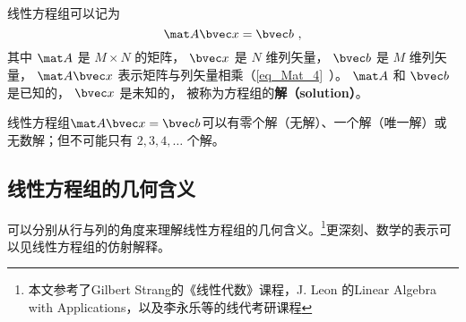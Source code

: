 
\begin{issues}
\issueDraft
\end{issues}


线性方程组可以记为
\begin{equation}\label{eq_LinEq_1}
\mat A \bvec x = \bvec b~,
\end{equation}
其中 $\mat A$ 是 $M \times N$ 的矩阵， $\bvec x$ 是 $N$ 维列矢量， $\bvec b$ 是 $M$ 维列矢量， $\mat A \bvec x$ 表示矩阵与列矢量相乘（\autoref{eq_Mat_4}~）。 $\mat A$ 和 $\bvec b$ 是已知的， $\bvec x$ 是未知的， 被称为方程组的\textbf{解（solution）}。

线性方程组$\mat A \bvec x=\bvec b$可以有零个解（无解）、一个解（唯一解）或无数解；但不可能只有 $2,3,4,\dots$ 个解。


\subsection{线性方程组的几何含义}\label{sub_LinEq_2}
可以分别从行与列的角度来理解线性方程组的几何含义。\footnote{本文参考了Gilbert Strang的《线性代数》课程，J. Leon 的Linear Algebra with Applications，以及李永乐等的线代考研课程}更深刻、数学的表示可以见线性方程组的仿射解释。

